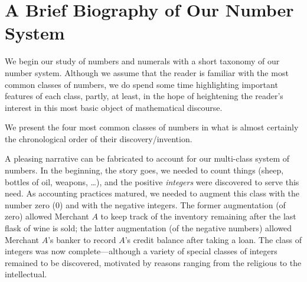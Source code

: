 \section{A Brief Biography of Our Number System}
\label{sec:number-taxonomy}
\label{sec:numbers}

We begin our study of numbers and numerals with a short taxonomy of our number system.  Although we assume that the reader is familiar with the most common classes of numbers, we do spend some time highlighting important features of each class, partly, at least, in the hope of heightening the reader's interest in this most basic object of mathematical discourse.

We present the four most common classes of numbers in what is almost certainly the chronological order of their discovery/invention.

\medskip

\noindent {}

\medskip

 
  

\noindent
A pleasing narrative can be fabricated to account for our multi-class system of numbers.  In the beginning, the story goes, we needed to count things (sheep, bottles of oil, weapons, \ldots), and the positive {\it integers} were discovered to serve this need.  As accounting practices matured, we needed to augment this class with the number zero ($0$) and with the negative integers.  The former augmentation (of zero) allowed Merchant $A$ to keep track of the inventory remaining after the last flask of wine is sold; the latter augmentation (of the negative numbers) allowed Merchant $A$'s banker to record $A$'s credit balance after taking a loan.  The class of integers was now complete---although a variety of special classes of integers remained to be discovered, motivated by reasons ranging from the religious to the intellectual.

